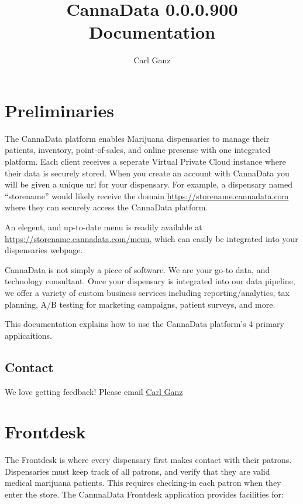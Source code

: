 \documentclass[]{book}
\title{CannaData 0.0.0.900 Documentation}
\author{Carl Ganz}
\date{}
\theoremstyle{definition}
\theoremstyle{definition}
\theoremstyle{definition}
\theoremstyle{remark}
\begin{document}
\maketitle

{
\setcounter{tocdepth}{1}
\tableofcontents
}
\chapter{Preliminaries}\label{preliminaries}

The CannaData platform enables Marijuana dispensaries to manage their
patients, inventory, point-of-sales, and online presense with one
integrated platform. Each client receives a seperate Virtual Private
Cloud instance where their data is securely stored. When you create an
account with CannaData you will be given a unique url for your
dispensary. For example, a dispensary named ``storename'' would likely
receive the domain \url{https://storename.cannadata.com} where they can
securely access the CannaData platform.

An elegent, and up-to-date menu is readily available at
\url{https://storename.cannadata.com/menu}, which can easily be
integrated into your dispensaries webpage.

CannaData is not simply a piece of software. We are your go-to data, and
technology consultant. Once your dispensary is integrated into our data
pipeline, we offer a variety of custom business services including
reporting/analytics, tax planning, A/B testing for marketing campaigns,
patient surveys, and more.

This documentation explains how to use the CannaData platform's 4
primary applicaitions.

\section{Contact}\label{contact}

We love getting feedback! Please email
\href{mailto:carl@cannadatasolutions.com}{Carl Ganz}

\chapter{Frontdesk}\label{frontdesk}

The Frontdesk is where every dispensary first makes contact with their
patrons. Dispensaries must keep track of all patrons, and verify that
they are valid medical marijuana patients. This requires checking-in
each patron when they enter the store. The CannnaData Frontdesk
application provides facilities for:
\end{document}
